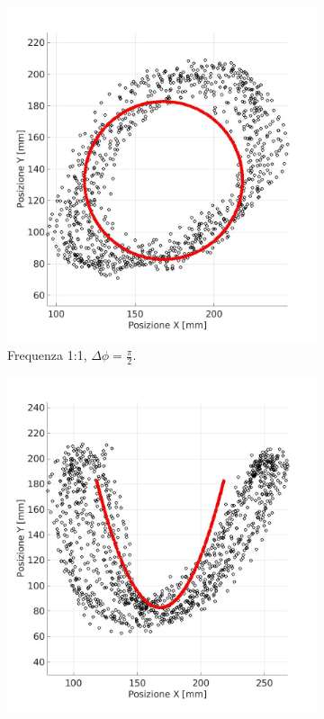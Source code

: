 \documentclass[12pt,twoside,openright]{report}
\begin{document}
\begin{figure}[h!]
\begin{subfigure}{0.49\textwidth}
    \includegraphics[width=\textwidth]{cc.jpg}
    \caption{Frequenza 1:1, $\Delta \phi= \frac{\pi}{2}$.}
    \label{fig:cc1}
    \vspace*{10mm}
\end{subfigure}
\hfill
\begin{subfigure}{0.49\textwidth}
    \includegraphics[width=\textwidth]{uc.jpg}

\end{subfigure}
\end{figure}
\end{document}
